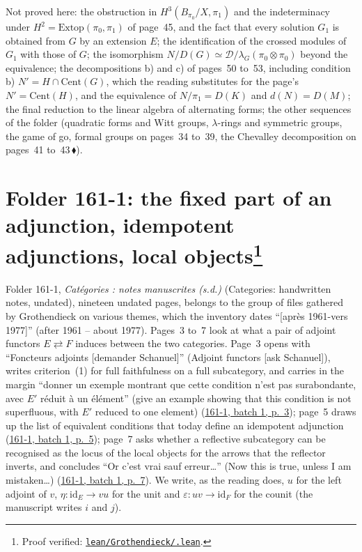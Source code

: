 \documentclass[11pt]{article}
\newcommand{\q}[1]{“#1”}
\newcommand{\lot}[3]{\href{https://grothendieck.commutator.io/\##1/#2/p#3}{#1, batch #2, p.~#3}}
\newcommand{\verifie}[1]{\footnote{Proof verified: \href{https://github.com/Commutator-IO/grothendieck-project/blob/article-lean-2026-10/lean/Grothendieck/#1.lean}{\texttt{lean/Grothendieck/\detokenize{#1}.lean}}.}}
\newcommand{\piste}[1]{\,\href{https://grothendieck.commutator.io/findings/\##1}{\textcolor{piste}{\ensuremath{\blacklozenge}}}}
\theoremstyle{plain}
\theoremstyle{definition}
\theoremstyle{remark}
\begin{document}
\noindent Not proved here: the obstruction in $H^3(B_{\pi_0}/X, \pi_1)$ and the indeterminacy under $H^2 = \mathrm{Extop}(\pi_0, \pi_1)$ of page~45, and the fact that every solution $G_1$ is obtained from $G$ by an extension $E$; the identification of the crossed modules of $G_1$ with those of $G$; the isomorphism $N/D(G) \simeq \mathcal D/\lambda_G(\pi_0 \otimes \pi_0)$ beyond the equivalence; the decompositions b) and c) of pages~50 to~53, including condition b) $N' = H \cap \mathrm{Cent}(G)$, which the reading substitutes for the page's $N' = \mathrm{Cent}(H)$, and the equivalence of $N/\pi_1 = D(K)$ and $d(N) = D(M)$; the final reduction to the linear algebra of alternating forms; the other sequences of the folder (quadratic forms and Witt groups, $\lambda$-rings and symmetric groups, the game of go, formal groups on pages~34 to~39, the Chevalley decomposition on pages~41 to~43\piste{133-affine-quotient-not-constructible}).

\section[Folder 161-1: the fixed part of an adjunction, idempotent adjunctions, local objects]{Folder 161-1: the fixed part of an adjunction, idempotent adjunctions, local objects\protect\verifie{Folder161_1}}\label{sec:161-1}

Folder 161-1, \emph{Catégories : notes manuscrites (s.d.)} (Categories: handwritten notes, undated), nineteen undated pages, belongs to the group of files gathered by Grothendieck on various themes, which the inventory dates \q{[après 1961-vers 1977]} (after 1961 -- about 1977). Pages~3 to~7 look at what a pair of adjoint functors $E \rightleftarrows F$ induces between the two categories. Page~3 opens with \q{Foncteurs adjoints [demander Schanuel]} (Adjoint functors [ask Schanuel]), writes criterion~(1) for full faithfulness on a full subcategory, and carries in the margin \q{donner un exemple montrant que cette condition n'est pas surabondante, avec $E'$ réduit à un élément} (give an example showing that this condition is not superfluous, with $E'$ reduced to one element) (\lot{161-1}{1}{3}); page~5 draws up the list of equivalent conditions that today define an idempotent adjunction (\lot{161-1}{1}{5}); page~7 asks whether a reflective subcategory can be recognised as the locus of the local objects for the arrows that the reflector inverts, and concludes \q{Or c'est vrai sauf erreur…} (Now this is true, unless I am mistaken…) (\lot{161-1}{1}{7}). We write, as the reading does, $u$ for the left adjoint of $v$, $\eta : \mathrm{id}_E \to vu$ for the unit and $\varepsilon : uv \to \mathrm{id}_F$ for the counit (the manuscript writes $i$ and $j$).
\end{document}
